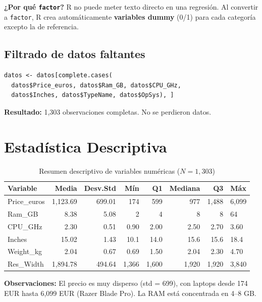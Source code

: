 \documentclass[12pt,a4paper]{article}
\begin{document}
\textbf{¿Por qué \texttt{factor}?} R no puede meter texto directo en una regresión. Al convertir a \texttt{factor}, R crea automáticamente \textbf{variables dummy} (0/1) para cada categoría excepto la de referencia.

\subsection{Filtrado de datos faltantes}

\begin{lstlisting}
datos <- datos[complete.cases(
  datos$Price_euros, datos$Ram_GB, datos$CPU_GHz,
  datos$Inches, datos$TypeName, datos$OpSys), ]
\end{lstlisting}

\textbf{Resultado:} 1,303 observaciones completas. No se perdieron datos.

\section{Estadística Descriptiva}

\begin{table}[H]
\centering
\caption{Resumen descriptivo de variables numéricas ($N=1{,}303$)}
\begin{tabular}{lrrrrrr}
\toprule
\textbf{Variable} & \textbf{Media} & \textbf{Desv.Std} & \textbf{Mín} & \textbf{Q1} & \textbf{Mediana} & \textbf{Q3} & \textbf{Máx} \\
\midrule
Price\_euros & 1{,}123.69 & 699.01 & 174 & 599 & 977 & 1{,}488 & 6{,}099 \\
Ram\_GB & 8.38 & 5.08 & 2 & 4 & 8 & 8 & 64 \\
CPU\_GHz & 2.30 & 0.51 & 0.90 & 2.00 & 2.50 & 2.70 & 3.60 \\
Inches & 15.02 & 1.43 & 10.1 & 14.0 & 15.6 & 15.6 & 18.4 \\
Weight\_kg & 2.04 & 0.67 & 0.69 & 1.50 & 2.04 & 2.30 & 4.70 \\
Res\_Width & 1{,}894.78 & 494.64 & 1{,}366 & 1{,}600 & 1{,}920 & 1{,}920 & 3{,}840 \\
\bottomrule
\end{tabular}
\end{table}

\textbf{Observaciones:} El precio es muy disperso (std = 699), con laptops desde 174 EUR hasta 6{,}099 EUR (Razer Blade Pro). La RAM está concentrada en 4--8 GB.
\end{document}
